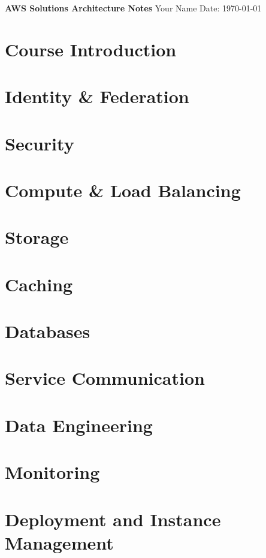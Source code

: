 \documentclass[11pt]{article}
\begin{document}
    \begin{titlepage}
        \centering
        \vspace*{2in}
        \Huge \textbf{AWS Solutions Architecture Notes}
        \vfill
        \Large Your Name
        \vfill
        \Large Date: \today
    \end{titlepage}

    \newpage

    \tableofcontents
    \newpage


    \chapter{Course Introduction}
    \chapter{Identity \& Federation}
    \chapter{Security}
    \chapter{Compute \& Load Balancing}
    \chapter{Storage}
    \chapter{Caching}
    \chapter{Databases}
    \chapter{Service Communication}
    \chapter{Data Engineering}
    \chapter{Monitoring}
    \chapter{Deployment and Instance Management}
\end{document}
